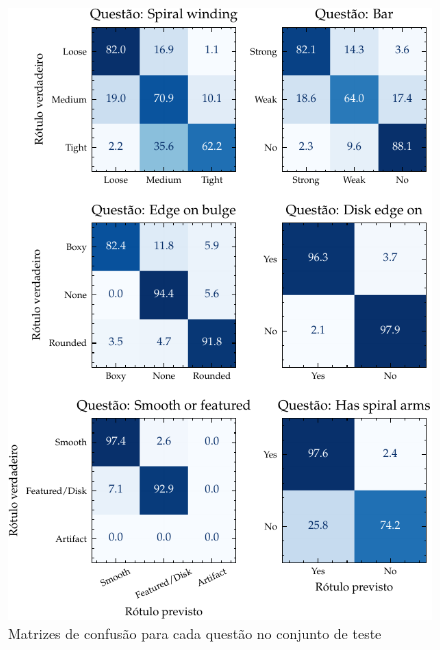 \begin{figure}[!ht]
  \centering
  \caption{Matrizes de confusão para cada questão no conjunto de teste}
  \label{fig:cm_1}
  \includegraphics[width=\linewidth]{notebooks/plots/cm_1.pdf}
\end{figure}

